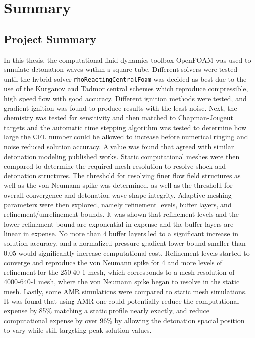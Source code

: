 \chapter{Summary}
\label{summary}

\section{Project Summary}
In this thesis, the computational fluid dynamics toolbox OpenFOAM was used to simulate detonation waves within a square tube. Different solvers were tested until the hybrid solver \verb|rhoReactingCentralFoam| was decided as best due to the use of the Kurganov and Tadmor central schemes which reproduce compressible, high speed flow with good accuracy. Different ignition methods were tested, and gradient ignition was found to produce results with the least noise. Next, the chemistry was tested for sensitivity and then matched to Chapman-Jougeut targets and the automatic time stepping algorithm was tested to determine how large the CFL number could be allowed to increase before numerical ringing and noise reduced solution accuracy. A value was found that agreed with similar detonation modeling published works. Static computational meshes were then compared to determine the required mesh resolution to resolve shock and detonation structures. The threshold for resolving finer flow field structures as well as the von Neumann spike was determined, as well as the threshold for overall convergence and detonation wave shape integrity. Adaptive meshing parameters were then explored, namely refinement levels, buffer layers, and refinement/unrefinement bounds. It was shown that refinement levels and the lower refinement bound are exponential in expense and the buffer layers are linear in expense. No more than 4 buffer layers led to a significant increase in solution accuracy, and a normalized pressure gradient lower bound smaller than 0.05 would significantly increase computational cost. Refinement levels started to converge and reproduce the von Neumann spike for 4 and more levels of refinement for the 250-40-1 mesh, which corresponds to a mesh resolution of 4000-640-1 mesh, where the von Neumann spike began to resolve in the static mesh. Lastly, some AMR simulations were compared to static mesh simulations. It was found that using AMR one could potentially reduce the computational expense by 85\% matching a static profile nearly exactly, and reduce computational expense by over 96\% by allowing the detonation spacial position to vary while still targeting peak solution values. 



